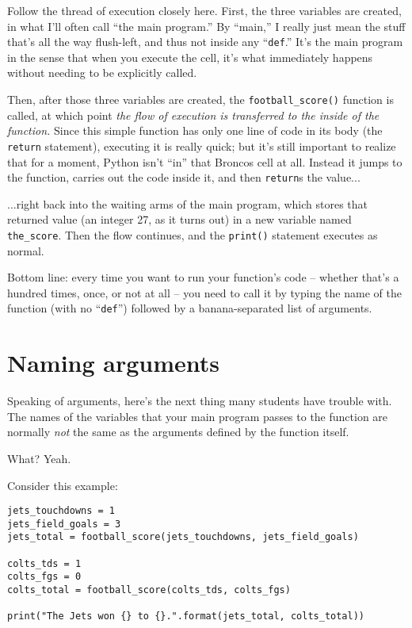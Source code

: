 
Follow the thread of execution closely here. First, the three variables are
created, in what I'll often call ``the main program.'' By ``main,'' I really
just mean the stuff that's all the way flush-left, and thus not inside any
``\texttt{def}.'' It's the main program in the sense that when you execute the
cell, it's what immediately happens without needing to be explicitly called.

Then, after those three variables are created, the \texttt{football\_score()}
function is called, at which point \textit{the flow of execution is transferred
to the inside of the function.} Since this simple function has only one line of
code in its body (the \texttt{return} statement), executing it is really quick;
but it's still important to realize that for a moment, Python isn't ``in'' that
Broncos cell at all. Instead it jumps to the function, carries out the code
inside it, and then \texttt{return}s the value...

...right back into the waiting arms of the main program, which stores that
returned value (an integer 27, as it turns out) in a new variable named
\texttt{the\_score}. Then the flow continues, and the \texttt{print()}
statement executes as normal.

Bottom line: every time you want to run your function's code -- whether that's
a hundred times, once, or not at all -- you need to call it by typing the name
of the function (with no ``\texttt{def}'') followed by a banana-separated list
of arguments.

\section{Naming arguments}


Speaking of arguments, here's the next thing many students have trouble with.
The names of the variables that your main program passes to the function are
normally \textit{not} the same as the arguments defined by the function itself.

What? Yeah.

Consider this example:


\begin{Verbatim}[fontsize=\footnotesize,samepage=true,frame=single,framesep=3mm]
jets_touchdowns = 1
jets_field_goals = 3
jets_total = football_score(jets_touchdowns, jets_field_goals)

colts_tds = 1
colts_fgs = 0
colts_total = football_score(colts_tds, colts_fgs)

print("The Jets won {} to {}.".format(jets_total, colts_total))
\end{Verbatim}
\vspace{-.2in}

